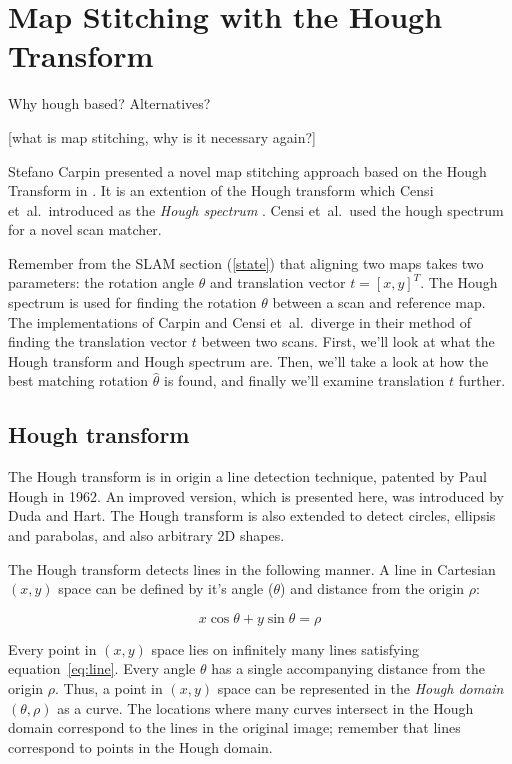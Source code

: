 
\chapter{Map Stitching with the Hough Transform}
Why hough based?
Alternatives?

[what is map stitching, why is it necessary again?]

Stefano Carpin presented a novel map stitching approach based on the Hough Transform in \cite{carpin2002merging}. It is an extention of the Hough transform which Censi et~al.\ introduced as the \emph{Hough spectrum} \cite{censi2005scan}. Censi et~al.\ used the hough spectrum for a novel scan matcher. 

Remember from the SLAM section (\ref{state}) that aligning two maps takes two parameters: the rotation angle $\theta$ and translation vector $t = [x, y]^T$. The Hough spectrum is used for finding the rotation $\theta$ between a scan and reference map. The implementations of Carpin and Censi et~al.\ diverge in their method of finding the translation vector $t$ between two scans. First, we'll look at what the Hough transform and Hough spectrum are. Then, we'll take a look at how the best matching rotation $\hat\theta$ is found, and finally we'll examine translation $t$ further.

\section{Hough transform}
The Hough transform is in origin a line detection technique, patented by Paul Hough in 1962\cite{hough1962method}. An improved version, which is presented here, was introduced by Duda and Hart\cite{duda1972use}. The Hough transform is also extended to detect circles, ellipsis and parabolas, and also arbitrary 2D shapes\cite{ballard1981generalizing}.

The Hough transform detects lines in the following manner. A line in Cartesian $(x, y)$ space can be defined by it's angle ($\theta$) and distance from the origin $\rho$:

\begin{equation}
\label{eq:line}
x\cos \theta + y\sin \theta = \rho
\end{equation}

Every point in $(x,y)$ space lies on infinitely many lines satisfying equation~\ref{eq:line}. Every angle $\theta$ has a single accompanying distance from the origin $\rho$. Thus, a point in $(x,y)$ space can be represented in the \emph{Hough domain} $(\theta, \rho)$ as a curve. The locations where many curves intersect in the Hough domain correspond to the lines in the original image; remember that lines correspond to points in the Hough domain. 

